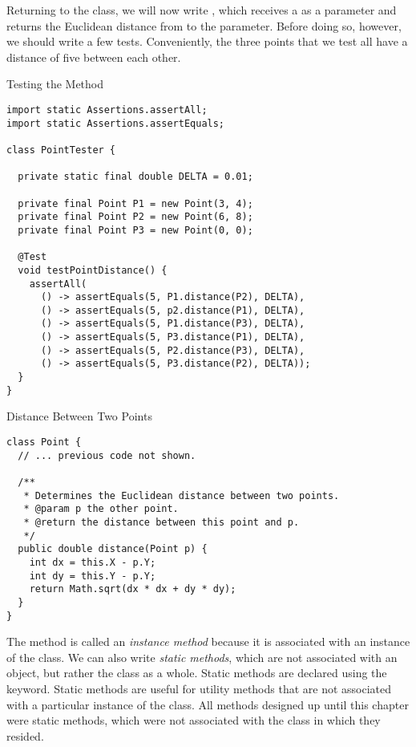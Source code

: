 Returning to the  class, we will now write , which receives a  as a parameter and returns the Euclidean distance from  to the parameter. Before doing so, however, we should write a few tests. Conveniently, the three points that we test all have a distance of five between each other.

\begin{cl}[]{Testing the  Method}
\begin{lstlisting}[language=MyJava]
import static Assertions.assertAll;
import static Assertions.assertEquals;

class PointTester {

  private static final double DELTA = 0.01;

  private final Point P1 = new Point(3, 4);
  private final Point P2 = new Point(6, 8);
  private final Point P3 = new Point(0, 0);

  @Test
  void testPointDistance() {
    assertAll(
      () -> assertEquals(5, P1.distance(P2), DELTA),
      () -> assertEquals(5, p2.distance(P1), DELTA),
      () -> assertEquals(5, P1.distance(P3), DELTA),
      () -> assertEquals(5, P3.distance(P1), DELTA),
      () -> assertEquals(5, P2.distance(P3), DELTA),
      () -> assertEquals(5, P3.distance(P2), DELTA));
  }
}
\end{lstlisting}
\end{cl}

\begin{cl}[]{Distance Between Two Points}
\begin{lstlisting}[language=MyJava]
class Point {
  // ... previous code not shown.

  /**
   * Determines the Euclidean distance between two points.
   * @param p the other point.
   * @return the distance between this point and p.
   */
  public double distance(Point p) {
    int dx = this.X - p.Y;
    int dy = this.Y - p.Y;
    return Math.sqrt(dx * dx + dy * dy);
  }
}
\end{lstlisting}
\end{cl}

The  method is called an \textit{instance method} because it is associated with an instance of the class. We can also write \textit{static methods}, which are not associated with an object, but rather the class as a whole. Static methods are declared using the  keyword. Static methods are useful for utility methods that are not associated with a particular instance of the class. All methods designed up until this chapter were static methods, which were not associated with the class in which they resided.

